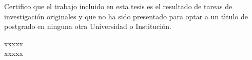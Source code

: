 


\setcounter{tocdepth}{5}

%
%

\renewcommand{\tablename}{Tabla}
\renewcommand{\listtablename}{{\'I}ndice de tablas}


\thispagestyle{empty}%
Certifico que el trabajo incluido en esta tesis es el resultado de tareas de investigaci{\'o}n originales y que no ha sido presentado para optar a un t{\'\i}tulo de postgrado en ninguna otra
Universidad o Instituci{\'o}n.\\
\vspace{0.5cm}
\begin{flushright}
\large{}\selectfont
xxxxx\\
\normalsize\sffamily
xxxxx
\end{flushright}

%

%

%
%

\tableofcontents 

\renewcommand{\baselinestretch}{1.2} %







